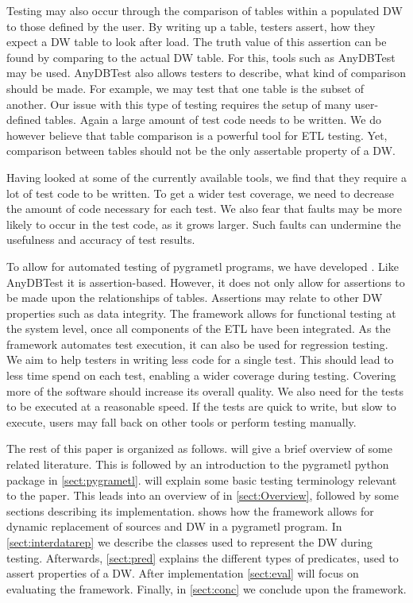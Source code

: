 Testing may also occur through the comparison of tables within a populated DW to those defined by the user. By writing up a table, testers assert, how they expect a DW table to look after load. The truth value of this assertion can be found by comparing to the actual DW table. For this, tools such as AnyDBTest\cite{AnyDbTest} may be used. AnyDBTest also allows testers to describe, what kind of comparison should be made. For example, we may test that one table is the subset of another. Our issue with this type of testing requires the setup of many user-defined tables. Again a large amount of test code needs to be written. We do however believe that table comparison is a powerful tool for ETL testing. Yet, comparison between tables should not be the only assertable property of a DW.

Having looked at some of the currently available tools, we find that they require a lot of test code to be written. To get a wider test coverage, we need to decrease the amount of code necessary for each test. We also fear that faults may be more likely to occur in the test code, as it grows larger. Such faults can undermine the usefulness and accuracy of test results.

To allow for automated testing of pygrametl programs, we have developed \FW{}. Like AnyDBTest it is assertion-based. However, it does not only allow for assertions to be made upon the relationships of tables. Assertions may relate to other DW properties such as data integrity. The framework allows for functional testing at the system level, once all components of the ETL have been integrated. As the framework automates test execution, it can also be used for regression testing. We aim to help testers in writing less code for a single test. This should lead to less time spend on each test, enabling a wider coverage during testing. Covering more of the software should increase its overall quality. We also need for the tests to be executed at a reasonable speed. If the tests are quick to write, but slow to execute, users may fall back on other tools or perform testing manually.

The rest of this paper is organized as follows.  will give a brief overview of some related literature. This is followed by an introduction to the pygrametl python package in \cref{sect:pygrametl}.  will explain some basic testing terminology relevant to the paper. This leads into an overview of \FW{} in \cref{sect:Overview}, followed by some sections describing its implementation.  shows how the framework allows for dynamic replacement of sources and DW in a pygrametl program.  In \cref{sect:interdatarep} we describe the classes used to represent the DW during testing. Afterwards, \cref{sect:pred} explains the different types of predicates, used to assert properties of a DW. After implementation \cref{sect:eval} will focus on evaluating the framework. Finally, in \cref{sect:conc} we conclude upon the framework.


